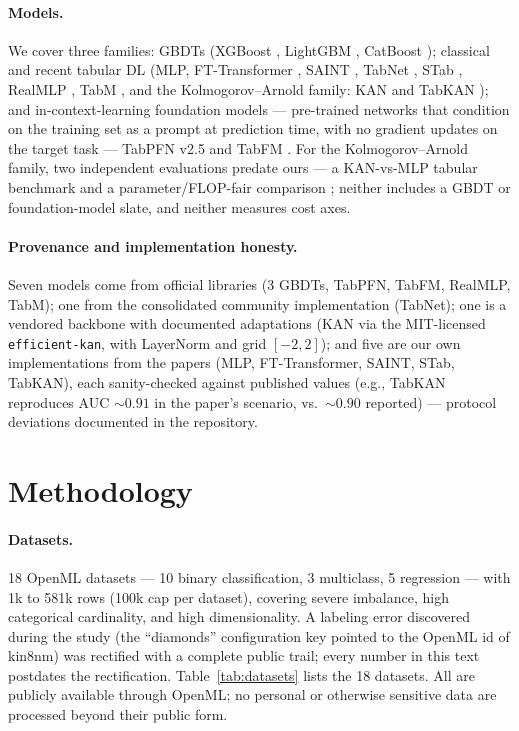 \documentclass[11pt]{article}
\begin{document}
\paragraph{Models.} We cover three families: GBDTs (XGBoost
\citep{chen2016}, LightGBM \citep{ke2017}, CatBoost
\citep{prokhorenkova2018}); classical and recent tabular DL (MLP,
FT-Transformer \citep{gorishniy2021}, SAINT \citep{somepalli2021}, TabNet
\citep{arik2021}, STab \citep{stab-ref}, RealMLP \citep{realmlp2024}, TabM
\citep{tabm2025}, and the Kolmogorov--Arnold family: KAN \citep{kan2024}
and TabKAN \citep{tabkan2025}); and in-context-learning foundation models --- pre-trained networks that
condition on the training set as a prompt at prediction time, with no
gradient updates on the target task --- TabPFN v2.5
\citep{hollmann2025,priorlabs2025} and TabFM \citep{tabfm2026}. For the
Kolmogorov--Arnold family, two independent evaluations predate ours --- a
KAN-vs-MLP tabular benchmark \citep{poeta2024} and a parameter/FLOP-fair
comparison \citep{kancritical2024}; neither includes a GBDT or
foundation-model slate, and neither measures cost axes.

\paragraph{Provenance and implementation honesty.} Seven models come from
official libraries (3 GBDTs, TabPFN, TabFM, RealMLP, TabM); one from the
consolidated community implementation (TabNet); one is a vendored backbone
with documented adaptations (KAN via the MIT-licensed
\texttt{efficient-kan}, with LayerNorm and grid $[-2,2]$); and five are our own implementations from
the papers (MLP, FT-Transformer, SAINT, STab, TabKAN), each sanity-checked
against published values (e.g., TabKAN reproduces AUC ${\sim}0.91$ in the
paper's scenario, vs.\ ${\sim}0.90$ reported) --- protocol deviations
documented in the repository.

\section{Methodology}

\paragraph{Datasets.} 18 OpenML datasets \citep{vanschoren2014} --- 10
binary classification, 3 multiclass, 5 regression --- with 1k to 581k rows
(100k cap per dataset), covering severe imbalance, high categorical
cardinality, and high dimensionality. A labeling error discovered during
the study (the ``diamonds'' configuration key pointed to the OpenML id of
kin8nm) was rectified with a complete public trail; every number in this
text postdates the rectification. Table~\ref{tab:datasets} lists the 18
datasets. All are publicly available through OpenML; no personal or
otherwise sensitive data are processed beyond their public form.
\end{document}
